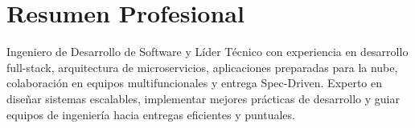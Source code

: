 \section*{Resumen Profesional}
Ingeniero de Desarrollo de Software y Líder Técnico con experiencia en desarrollo full-stack, arquitectura de microservicios, aplicaciones preparadas para la nube, colaboración en equipos multifuncionales y entrega Spec-Driven. Experto en diseñar sistemas escalables, implementar mejores prácticas de desarrollo y guiar equipos de ingeniería hacia entregas eficientes y puntuales.
